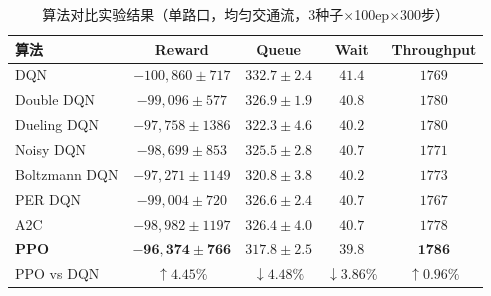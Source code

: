\begin{table}[htbp]
\centering
\caption{算法对比实验结果（单路口，均匀交通流，3种子$\times$100ep$\times$300步）}
\label{tab:algorithm_comparison}
\begin{tabular}{lcccc}
\toprule
\textbf{算法} & \textbf{Reward} & \textbf{Queue} & \textbf{Wait} & \textbf{Throughput} \\
\midrule
DQN        & $-100{,}860 \pm 717$ & $332.7 \pm 2.4$ & $41.4$ & $1769$ \\
Double DQN & $-99{,}096 \pm 577$  & $326.9 \pm 1.9$ & $40.8$ & $1780$ \\
Dueling DQN& $-97{,}758 \pm 1386$ & $322.3 \pm 4.6$ & $40.2$ & $1780$ \\
Noisy DQN  & $-98{,}699 \pm 853$  & $325.5 \pm 2.8$ & $40.7$ & $1771$ \\
Boltzmann DQN & $-97{,}271 \pm 1149$ & $320.8 \pm 3.8$ & $40.2$ & $1773$ \\
PER DQN    & $-99{,}004 \pm 720$  & $326.6 \pm 2.4$ & $40.7$ & $1767$ \\
A2C        & $-98{,}982 \pm 1197$ & $326.4 \pm 4.0$ & $40.7$ & $1778$ \\
\textbf{PPO} & $\mathbf{-96{,}374 \pm 766}$ & $\mathbf{317.8 \pm 2.5}$ & $\mathbf{39.8}$ & $\mathbf{1786}$ \\
\midrule
PPO vs DQN  & $\uparrow 4.45\%$ & $\downarrow 4.48\%$ & $\downarrow 3.86\%$ & $\uparrow 0.96\%$ \\
\bottomrule
\end{tabular}
\end{table}
